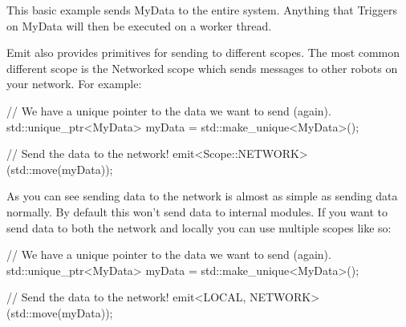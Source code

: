 \documentclass[english,12pt]{scrartcl}
\begin{document}
				This basic example sends MyData to the entire system.
				Anything that Triggers on MyData will then be executed on a worker thread.

				Emit also provides primitives for sending to different scopes.
				The most common different scope is the Networked scope which sends messages to other robots on your network.
				For example:

				\begin{cppcode}
					// We have a unique pointer to the data we want to send (again).
					std::unique_ptr<MyData> myData = std::make_unique<MyData>();

					// Send the data to the network!
					emit<Scope::NETWORK>(std::move(myData));
				\end{cppcode}

				As you can see sending data to the network is almost as simple as sending data normally.
				By default this won't send data to internal modules.
				If you want to send data to both the network and locally you can use multiple scopes like so:

				\begin{cppcode}
					// We have a unique pointer to the data we want to send (again).
					std::unique_ptr<MyData> myData = std::make_unique<MyData>();

					// Send the data to the network!
					emit<LOCAL, NETWORK>(std::move(myData));
				\end{cppcode}
\end{document}
